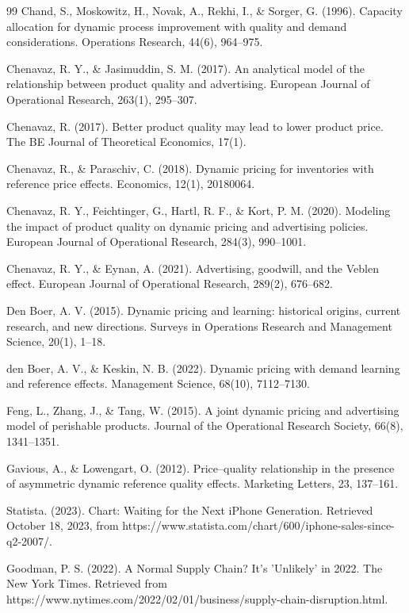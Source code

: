 \documentclass[]{interact}
\theoremstyle{plain}%
\theoremstyle{definition}
\theoremstyle{remark}
\begin{document}
\begin{thebibliography}{99}
Chand, S., Moskowitz, H., Novak, A., Rekhi, I., \& Sorger, G. (1996). Capacity allocation for dynamic process improvement with quality and demand considerations. Operations Research, 44(6), 964--975.

Chenavaz, R. Y., \& Jasimuddin, S. M. (2017). An analytical model of the relationship between product quality and advertising. European Journal of Operational Research, 263(1), 295--307.

Chenavaz, R. (2017). Better product quality may lead to lower product price. The BE Journal of Theoretical Economics, 17(1).

Chenavaz, R., \& Paraschiv, C. (2018). Dynamic pricing for inventories with reference price effects. Economics, 12(1), 20180064.

Chenavaz, R. Y., Feichtinger, G., Hartl, R. F., \& Kort, P. M. (2020). Modeling the impact of product quality on dynamic pricing and advertising policies. European Journal of Operational Research, 284(3), 990--1001.

Chenavaz, R. Y., \& Eynan, A. (2021). Advertising, goodwill, and the Veblen effect. European Journal of Operational Research, 289(2), 676--682.

Den Boer, A. V. (2015). Dynamic pricing and learning: historical origins, current research, and new directions. Surveys in Operations Research and Management Science, 20(1), 1--18.

den Boer, A. V., \& Keskin, N. B. (2022). Dynamic pricing with demand learning and reference effects. Management Science, 68(10), 7112--7130.

Feng, L., Zhang, J., \& Tang, W. (2015). A joint dynamic pricing and advertising model of perishable products. Journal of the Operational Research Society, 66(8), 1341--1351.

Gavious, A., \& Lowengart, O. (2012). Price–quality relationship in the presence of asymmetric dynamic reference quality effects. Marketing Letters, 23, 137--161.

Statista. (2023). Chart: Waiting for the Next iPhone Generation. Retrieved October 18, 2023, from https://www.statista.com/chart/600/iphone-sales-since-q2-2007/.

Goodman, P. S. (2022). A Normal Supply Chain? It's 'Unlikely' in 2022. The New York Times. Retrieved from https://www.nytimes.com/2022/02/01/business/supply-chain-disruption.html.


\end{thebibliography}
\end{document}
